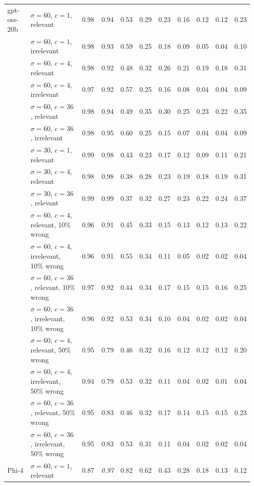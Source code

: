 \begin{tabular}{llrrrrrrrrr}
\midrule
gpt-oss-20b & $\sigma = 60$, $c = 1$, relevant & 0.98 & 0.94 & 0.53 & 0.29 & 0.23 & 0.16 & 0.12 & 0.12 & 0.23 \\
 & $\sigma = 60$, $c = 1$, irrelevant & 0.98 & 0.93 & 0.59 & 0.25 & 0.18 & 0.09 & 0.05 & 0.04 & 0.10 \\
 & $\sigma = 60$, $c = 4$, relevant & 0.98 & 0.92 & 0.48 & 0.32 & 0.26 & 0.21 & 0.19 & 0.18 & 0.31 \\
 & $\sigma = 60$, $c = 4$, irrelevant & 0.97 & 0.92 & 0.57 & 0.25 & 0.16 & 0.08 & 0.04 & 0.04 & 0.09 \\
 & $\sigma = 60$, $c = 36$, relevant & 0.98 & 0.94 & 0.49 & 0.35 & 0.30 & 0.25 & 0.23 & 0.22 & 0.35 \\
 & $\sigma = 60$, $c = 36$, irrelevant & 0.98 & 0.95 & 0.60 & 0.25 & 0.15 & 0.07 & 0.04 & 0.04 & 0.09 \\
 & $\sigma = 30$, $c = 1$, relevant & 0.99 & 0.98 & 0.43 & 0.23 & 0.17 & 0.12 & 0.09 & 0.11 & 0.21 \\
 & $\sigma = 30$, $c = 4$, relevant & 0.98 & 0.98 & 0.38 & 0.28 & 0.23 & 0.19 & 0.18 & 0.19 & 0.31 \\
 & $\sigma = 30$, $c = 36$, relevant & 0.99 & 0.99 & 0.37 & 0.32 & 0.27 & 0.23 & 0.22 & 0.24 & 0.37 \\
 & $\sigma = 60$, $c = 4$, relevant, 10\% wrong & 0.96 & 0.91 & 0.45 & 0.33 & 0.15 & 0.13 & 0.12 & 0.13 & 0.22 \\
 & $\sigma = 60$, $c = 4$, irrelevant, 10\% wrong & 0.96 & 0.91 & 0.55 & 0.34 & 0.11 & 0.05 & 0.02 & 0.02 & 0.04 \\
 & $\sigma = 60$, $c = 36$, relevant, 10\% wrong & 0.97 & 0.92 & 0.44 & 0.34 & 0.17 & 0.15 & 0.15 & 0.16 & 0.25 \\
 & $\sigma = 60$, $c = 36$, irrelevant, 10\% wrong & 0.96 & 0.92 & 0.53 & 0.34 & 0.10 & 0.04 & 0.02 & 0.02 & 0.04 \\
 & $\sigma = 60$, $c = 4$, relevant, 50\% wrong & 0.95 & 0.79 & 0.46 & 0.32 & 0.16 & 0.12 & 0.12 & 0.12 & 0.20 \\
 & $\sigma = 60$, $c = 4$, irrelevant, 50\% wrong & 0.94 & 0.79 & 0.53 & 0.32 & 0.11 & 0.04 & 0.02 & 0.01 & 0.04 \\
 & $\sigma = 60$, $c = 36$, relevant, 50\% wrong & 0.95 & 0.83 & 0.46 & 0.32 & 0.17 & 0.14 & 0.15 & 0.15 & 0.23 \\
 & $\sigma = 60$, $c = 36$, irrelevant, 50\% wrong & 0.95 & 0.83 & 0.53 & 0.31 & 0.11 & 0.04 & 0.02 & 0.02 & 0.04 \\
\midrule
Phi-4 & $\sigma = 60$, $c = 1$, relevant & 0.87 & \textit{0.97} & 0.82 & 0.62 & 0.43 & 0.28 & 0.18 & 0.13 & 0.12 \\

\end{tabular}

